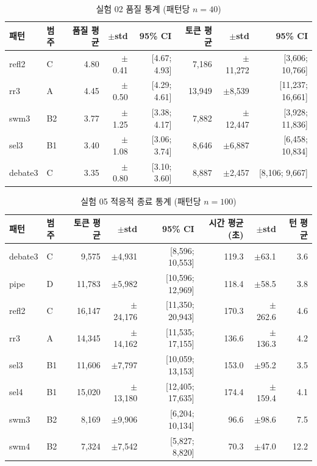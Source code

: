 \begin{table}[H]
\centering
\caption{실험 02 품질 통계 (패턴당 $n=40$)}
\label{tab:c2-exp02-stats}
{\footnotesize
\begin{tabular}{llrrrrrr}
\toprule
패턴 & 범주 & 품질 평균 & $\pm$std & 95\% CI & 토큰 평균 & $\pm$std & 95\% CI \\
\midrule
refl2   & C  & 4.80 & $\pm$0.41 & [4.67; 4.93]    & 7,186  & $\pm$11,272 & [3,606; 10,766] \\
rr3     & A  & 4.45 & $\pm$0.50 & [4.29; 4.61]    & 13,949 & $\pm$8,539  & [11,237; 16,661] \\
swm3    & B2 & 3.77 & $\pm$1.25 & [3.38; 4.17]    & 7,882  & $\pm$12,447 & [3,928; 11,836] \\
sel3    & B1 & 3.40 & $\pm$1.08 & [3.06; 3.74]    & 8,646  & $\pm$6,887  & [6,458; 10,834] \\
debate3 & C  & 3.35 & $\pm$0.80 & [3.10; 3.60]    & 8,887  & $\pm$2,457  & [8,106; 9,667] \\
\bottomrule
\end{tabular}
}
\end{table}

\begin{table}[H]
\centering
\caption{실험 05 적응적 종료 통계 (패턴당 $n=100$)}
\label{tab:c3-exp05-stats}
{\footnotesize
\begin{tabular}{llrrrrrr}
\toprule
패턴 & 범주 & 토큰 평균 & $\pm$std & 95\% CI & 시간 평균(초) & $\pm$std & 턴 평균 \\
\midrule
debate3 & C  & 9,575  & $\pm$4,931  & [8,596; 10,553]  & 119.3 & $\pm$63.1  & 3.6 \\
pipe    & D  & 11,783 & $\pm$5,982  & [10,596; 12,969] & 118.4 & $\pm$58.5  & 3.8 \\
refl2   & C  & 16,147 & $\pm$24,176 & [11,350; 20,943] & 170.3 & $\pm$262.6 & 4.6 \\
rr3     & A  & 14,345 & $\pm$14,162 & [11,535; 17,155] & 136.6 & $\pm$136.3 & 4.2 \\
sel3    & B1 & 11,606 & $\pm$7,797  & [10,059; 13,153] & 153.0 & $\pm$95.2  & 3.5 \\
sel4    & B1 & 15,020 & $\pm$13,180 & [12,405; 17,635] & 174.4 & $\pm$159.4 & 4.1 \\
swm3    & B2 & 8,169  & $\pm$9,906  & [6,204; 10,134]  & 96.6  & $\pm$98.6  & 7.5 \\
swm4    & B2 & 7,324  & $\pm$7,542  & [5,827; 8,820]   & 70.3  & $\pm$47.0  & 12.2 \\
\bottomrule
\end{tabular}
}
\end{table}

